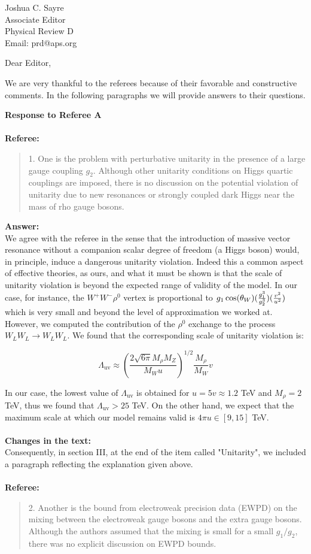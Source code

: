 \documentclass[10pt,a4paper]{letter}
\begin{document}
 
	\begin{letter}{Joshua C. Sayre\\ 
			Associate Editor\\
			Physical Review D\\
			Email: prd@aps.org} 
		\opening{Dear Editor,} 
		
		We are very thankful to the referees because of their favorable and constructive comments. In the following paragraphs we will provide answers to their questions.
		
		{\bf Response to Referee A}
		\\
		\\
		{\bf Referee:}
\begin{quotation}
	1. One is the problem with perturbative unitarity in the presence of a
	large gauge coupling $g_2$. Although other unitarity conditions on Higgs
	quartic couplings are imposed, there is no discussion on the potential
	violation of unitarity due to new resonances or strongly coupled dark
	Higgs near the mass of rho gauge bosons.
\end{quotation}	

{\bf Answer:}\\
We agree with the referee in the sense that the introduction of massive vector resonance without a companion scalar degree of freedom (a Higgs boson) would, in principle, induce a dangerous unitarity violation. Indeed this a common aspect of effective theories, as ours, and what it must be shown is that the scale of unitarity violation is beyond the expected range of validity of the model. In our case, for instance, the $W^{+}W^{-}\rho^0$ vertex is proportional to $g_1 \cos(\theta_W)({g_1^3 \over g_2^3}) ({v^2 \over u^2})$ which is very small and beyond the level of approximation we worked at. However, we computed the contribution of the $\rho^0$ exchange to the process $W_L W_L \rightarrow W_L W_L$. We found that the corresponding scale of unitarity violation is:

\[
\Lambda_{\mathrm{uv}}\approx \left(\frac{2\sqrt{6\pi}M_{\rho}M_Z}{M_W u}\right)^{1/2}\frac{M_{\rho}}{M_W} v
\]

In our case, the lowest value of $\Lambda_{\mathrm{uv}}$ is obtained for $u=5v\approx 1.2$ TeV and $M_{\rho}=2$ TeV, thus we found that $\Lambda_{\mathrm{uv}} > 25$ TeV. On the other hand, we expect that the maximum scale at which our model remains valid is $4\pi u \in [9,15]$ TeV.
\\
\\
\newpage
{\bf Changes in the text:}\\
Consequently, in section III, at the end of the item called "Unitarity", we included a paragraph reflecting the explanation given above.
\\
\\
{\bf Referee:}
\begin{quotation}
	2. Another is the bound from electroweak precision data (EWPD) on the
	mixing between the electroweak gauge bosons and the extra gauge
	bosons. Although the authors assumed that the mixing is small for a
	small $g_1/g_2$, there was no explicit discussion on EWPD bounds.
\end{quotation}


\end{letter}
\end{document}
